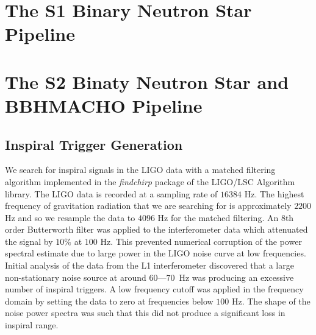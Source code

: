 
\section{The S1 Binary Neutron Star Pipeline}

\section{The S2 Binaty Neutron Star and BBHMACHO Pipeline}

\subsection{Inspiral Trigger Generation}
\label{ss:trigger}

We search for inspiral signals in the LIGO data with a matched
filtering\cite{wz} algorithm implemented in the \emph{findchirp}
package\cite{findchirp} of the LIGO/LSC Algorithm library\cite{lal}. The LIGO
data is recorded at a sampling rate of $16384$ Hz.  The highest frequency of
gravitation radiation that we are searching for is approximately $2200$ Hz and
so we resample the data to $4096$ Hz for the matched filtering.  An 8th order
Butterworth filter was applied to the interferometer data which attenuated the
signal by $10\%$ at $100$ Hz. This prevented numerical corruption of the power
spectral estimate due to large power in the LIGO noise curve at low
frequencies. Initial analysis of the data from the L1 interferometer
discovered that a large non-stationary noise source at around $60$---$70$~Hz
was producing an excessive number of inspiral triggers. A low frequency cutoff
was applied in the frequency domain by setting the data to zero at frequencies
below $100$ Hz.  The shape of the noise power spectra was such that this did
not produce a significant loss in inspiral range. 

